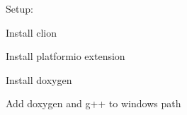 \label{index_md_nuli_avionics_flight_software_README}%
%
 Setup\+:
\begin{DoxyItemize}
\item Install clion
\item Install platformio extension
\item Install doxygen
\item Add doxygen and g++ to windows path 
\end{DoxyItemize}